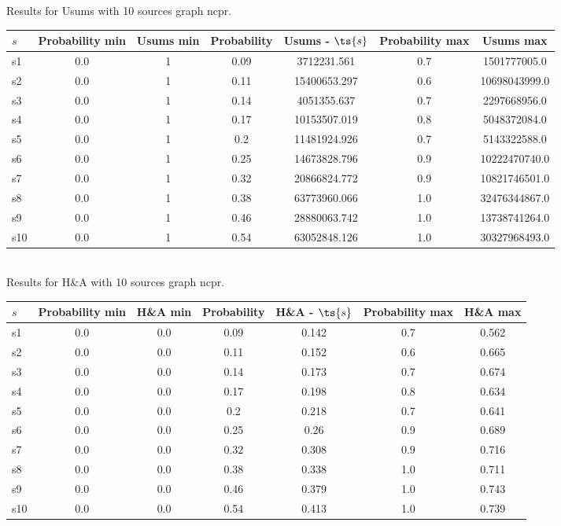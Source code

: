 \documentclass{article}
\begin{document}
\noindent Results for Usums with 10 sources graph ncpr.

\noindent\begin{tabular}{|l|c|c|c|c|c|c|}
\hline
$s$& Probability min & Usums min & Probability & Usums - $\ts{s}$ & Probability max & Usums max\\
\hline
s1 &0.0 & 1 & 0.09 & 3712231.561 & 0.7 & 1501777005.0\\
\hline
s2 &0.0 & 1 & 0.11 & 15400653.297 & 0.6 & 10698043999.0\\
\hline
s3 &0.0 & 1 & 0.14 & 4051355.637 & 0.7 & 2297668956.0\\
\hline
s4 &0.0 & 1 & 0.17 & 10153507.019 & 0.8 & 5048372084.0\\
\hline
s5 &0.0 & 1 & 0.2 & 11481924.926 & 0.7 & 5143322588.0\\
\hline
s6 &0.0 & 1 & 0.25 & 14673828.796 & 0.9 & 10222470740.0\\
\hline
s7 &0.0 & 1 & 0.32 & 20866824.772 & 0.9 & 10821746501.0\\
\hline
s8 &0.0 & 1 & 0.38 & 63773960.066 & 1.0 & 32476344867.0\\
\hline
s9 &0.0 & 1 & 0.46 & 28880063.742 & 1.0 & 13738741264.0\\
\hline
s10 &0.0 & 1 & 0.54 & 63052848.126 & 1.0 & 30327968493.0\\
\hline
\end{tabular}\\

\noindent Results for H\&A with 10 sources graph ncpr.

\noindent\begin{tabular}{|l|c|c|c|c|c|c|}
\hline
$s$& Probability min & H\&A min & Probability & H\&A - $\ts{s}$ & Probability max & H\&A max\\
\hline
s1 &0.0 & 0.0 & 0.09 & 0.142 & 0.7 & 0.562\\
\hline
s2 &0.0 & 0.0 & 0.11 & 0.152 & 0.6 & 0.665\\
\hline
s3 &0.0 & 0.0 & 0.14 & 0.173 & 0.7 & 0.674\\
\hline
s4 &0.0 & 0.0 & 0.17 & 0.198 & 0.8 & 0.634\\
\hline
s5 &0.0 & 0.0 & 0.2 & 0.218 & 0.7 & 0.641\\
\hline
s6 &0.0 & 0.0 & 0.25 & 0.26 & 0.9 & 0.689\\
\hline
s7 &0.0 & 0.0 & 0.32 & 0.308 & 0.9 & 0.716\\
\hline
s8 &0.0 & 0.0 & 0.38 & 0.338 & 1.0 & 0.711\\
\hline
s9 &0.0 & 0.0 & 0.46 & 0.379 & 1.0 & 0.743\\
\hline
s10 &0.0 & 0.0 & 0.54 & 0.413 & 1.0 & 0.739\\
\hline
\end{tabular}\\
\end{document}
